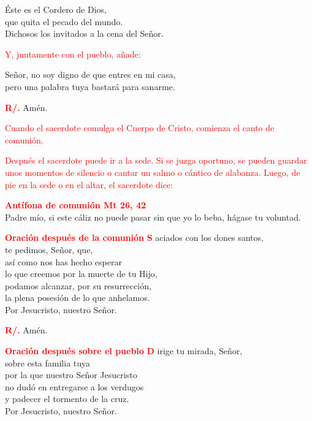 \documentclass[12pt, letterpaper]{report}
\begin{document}
	\noindent
	\Large \'Este es el Cordero de Dios,\\
	que quita el pecado del mundo.\\
	Dichosos los invitados a la cena del Se\~nor.

	\large{\textcolor{red}{Y, juntamente con el pueblo, a\~nade:}}

	\noindent
	\Large Se\~nor, no soy digno de que entres en mi casa,\\
	pero una palabra tuya bastar\'a para sanarme.

	\noindent
	\Large {\bfseries \textcolor{red}{R/.}} \hspace{0.5cm} Am\'en.

	\large{\textcolor{red}{Cuando el sacerdote comulga el Cuerpo de Cristo, comienza el canto de comuni\'on.}}

	\large{\textcolor{red}{Despu\'es el sacerdote puede ir a la sede. Si se juzga oportuno, se pueden guardar unos momentos de silencio o cantar un salmo o c\'antico de alabanza. Luego, de pie en la sede o en el altar, el sacerdote dice:}}

	\Large {\bfseries \textcolor{red}{Ant\'ifona de comuni\'on \hspace{1cm} Mt 26, 42}}\\
	\Large Padre mío, si este cáliz no puede pasar sin que yo lo beba, hágase tu voluntad.

	\Large {\bfseries \textcolor{red}{Oraci\'on despu\'es de la comuni\'on}}
	\lettrine[lines=2]{\bfseries \textcolor{red}{S}}{}\Large{ aciados con los dones santos,\\
	te pedimos, Señor, que,\\
	así como nos has hecho esperar\\
	lo que creemos por la muerte de tu Hijo,\\
	podamos alcanzar, por su resurrección,\\
	la plena posesión de lo que anhelamos.\\
	Por Jesucristo, nuestro Señor.}

	\noindent
	\Large {\bfseries \textcolor{red}{R/.}} \hspace{0.5cm} Am\'en.

	\Large {\bfseries \textcolor{red}{Oraci\'on despu\'es sobre el pueblo}}
	\lettrine[lines=2]{\bfseries \textcolor{red}{D}}{}\Large{ irige tu mirada, Señor,\\
	sobre esta familia tuya\\
	por la que nuestro Señor Jesucristo\\
	no dudó en entregarse a los verdugos\\
	y padecer el tormento de la cruz.\\
	Por Jesucristo, nuestro Señor.}
\end{document}
